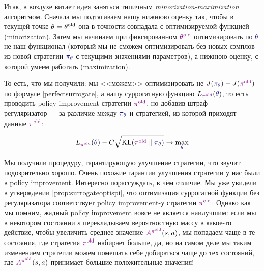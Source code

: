 Итак, в воздухе витает идея заняться типичным \emph{minorization-maximization} алгоритмом. Сначала мы подтягиваем нашу нижнюю оценку так, чтобы в текущей точке $\theta \HM= \theta^{\old}$ она в точности совпадала с оптимизируемой функцией (minorization). Затем мы начинаем при фиксированном $\textcolor{ChadPurple}{\theta^{\old}}$ оптимизировать по $\textcolor{ChadBlue}{\theta}$ не наш функционал (который мы не сможем оптимизировать без новых сэмплов из новой стратегии $\textcolor{ChadBlue}{\pi_\theta}$ с текущими значениями параметров), а нижнюю оценку, с которой умеем работать (maximization). 

То есть, что мы получили: мы <<можем>> оптимизировать не $J(\textcolor{ChadBlue}{\pi_\theta}) \HM- J(\textcolor{ChadPurple}{\pi^{\old}})$ по формуле \eqref{perfectsurrogate}, а нашу суррогатную функцию $L_{\textcolor{ChadPurple}{\pi^{\old}}}(\textcolor{ChadBlue}{\theta})$, то есть проводить policy improvement стратегии $\textcolor{ChadPurple}{\pi^{\old}}$, но добавив штраф --- регуляризатор --- за различие между $\textcolor{ChadBlue}{\pi_\theta}$ и стратегией, из которой приходят данные $\textcolor{ChadPurple}{\pi^{\old}}$:

\begin{equation}\label{lowerboundmean}
L_{\textcolor{ChadPurple}{\pi^{\old}}}(\textcolor{ChadBlue}{\theta}) - C \sqrt{\KL(\textcolor{ChadPurple}{\pi^{\old}} \parallel \textcolor{ChadBlue}{\pi_\theta}) } \to \max_{\textcolor{ChadBlue}{\theta}}
\end{equation}

Мы получили процедуру, гарантирующую улучшение стратегии, что звучит подозрительно хорошо. Очень похожие гарантии улучшения стратегии у нас были в policy improvement. Интересно порассуждать, в чём отличие. Мы уже увидели в утверждении \ref{prop:surrogateoptispi}, что оптимизация суррогатной функции без регуляризатора соответствует policy improvement-у стратегии $\textcolor{ChadPurple}{\pi^{\old}}$. Однако как мы помним, жадный policy improvement вовсе не является наилучшим: если мы в некотором состоянии $s$ перекладываем вероятностную массу в какое-то действие, чтобы увеличить среднее значение $\textcolor{ChadPurple}{A^{\pi^{\old}}}(s, a)$, мы попадаем чаще в те состояния, где стратегия $\textcolor{ChadPurple}{\pi^{\old}}$ набирает больше, да, но на самом деле мы таким изменением стратегии можем помешать себе добираться чаще до тех состояний, где $\textcolor{ChadPurple}{A^{\pi^{\old}}}(s, a)$ принимает большие положительные значения!

